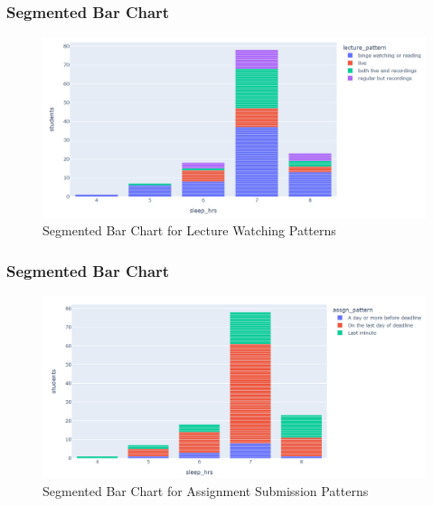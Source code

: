 \documentclass[11pt,]{beamer}
\begin{document}
\begin{frame}

    \frametitle{Segmented Bar Chart}
    
   \begin{figure}
		\includegraphics[width=12cm]{Seg_Barchart_Lecture_pattern.png}
		\caption{Segmented Bar Chart for Lecture Watching Patterns}
	\end{figure}
    
\end{frame}

\begin{frame}

    \frametitle{Segmented Bar Chart}
        
   \begin{figure}
		\includegraphics[width=12cm]{Seg_barchart_Assignments.png}
		\caption{Segmented Bar Chart for Assignment Submission Patterns}
	\end{figure}
    
\end{frame}
\end{document}
